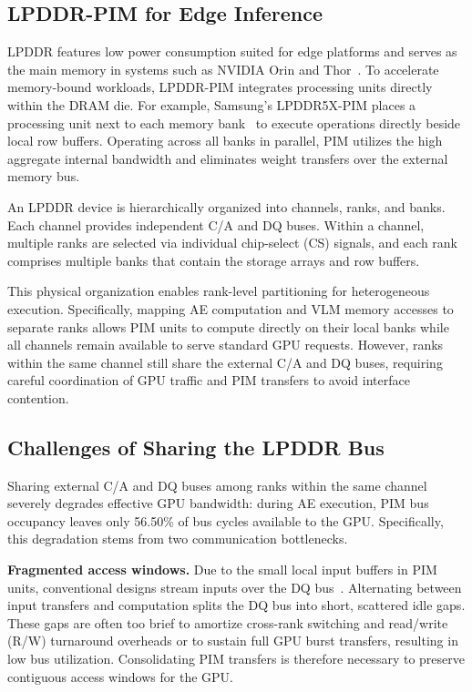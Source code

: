 \subsection{LPDDR-PIM for Edge Inference}
\label{sec:background-b}
LPDDR features low power consumption suited for edge platforms and serves as the main memory in systems such as NVIDIA Orin and Thor~\cite{micron_lpddr}. To accelerate memory-bound workloads, LPDDR-PIM integrates processing units directly within the DRAM die. For example, Samsung's LPDDR5X-PIM places a processing unit next to each memory bank~\cite{samsung_lpddr5x_pim} to execute operations directly beside local row buffers. Operating across all banks in parallel, PIM utilizes the high aggregate internal bandwidth and eliminates weight transfers over the external memory bus.

An LPDDR device is hierarchically organized into channels, ranks, and banks. Each channel provides independent C/A and DQ buses. Within a channel, multiple ranks are selected via individual chip-select (CS) signals, and each rank comprises multiple banks that contain the storage arrays and row buffers.

This physical organization enables rank-level partitioning for heterogeneous execution. Specifically, mapping AE computation and VLM memory accesses to separate ranks allows PIM units to compute directly on their local banks while all channels remain available to serve standard GPU requests. However, ranks within the same channel still share the external C/A and DQ buses, requiring careful coordination of GPU traffic and PIM transfers to avoid interface contention.

\subsection{Challenges of Sharing the LPDDR Bus}
\label{sec:background-c}
Sharing external C/A and DQ buses among ranks within the same channel severely degrades effective GPU bandwidth: during AE execution, PIM bus occupancy leaves only 56.50\% of bus cycles available to the GPU. Specifically, this degradation stems from two communication bottlenecks.

\textbf{Fragmented access windows.} Due to the small local input buffers in PIM units, conventional designs stream inputs over the DQ bus~\cite{samsung_lpddr5x_pim}. Alternating between input transfers and computation splits the DQ bus into short, scattered idle gaps. These gaps are often too brief to amortize cross-rank switching and read/write (R/W) turnaround overheads or to sustain full GPU burst transfers, resulting in low bus utilization. Consolidating PIM transfers is therefore necessary to preserve contiguous access windows for the GPU.

